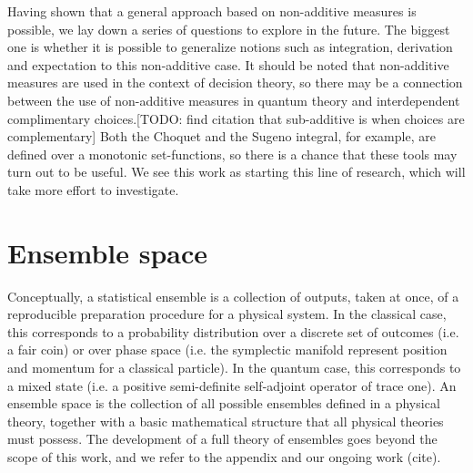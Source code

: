 \documentclass[10pt,twocolumn, nofootinbib]{revtex4-2}
\begin{document}
Having shown that a general approach based on non-additive measures is possible, we lay down a series of questions to explore in the future. The biggest one is whether it is possible to generalize notions such as integration, derivation and expectation to this non-additive case.  It should be noted that non-additive measures are used in the context of decision theory, so there may be a connection between the use of non-additive measures in quantum theory and interdependent complimentary choices.[TODO: find citation that sub-additive is when choices are complementary] Both the Choquet and the Sugeno integral, for example, are defined over a monotonic set-functions, so there is a chance that these tools may turn out to be useful. We see this work as starting this line of research, which will take more effort to investigate.

\section{Ensemble space}

Conceptually, a statistical ensemble is a collection of outputs, taken at once, of a reproducible preparation procedure for a physical system. In the classical case, this corresponds to a probability distribution over a discrete set of outcomes (i.e. a fair coin) or over phase space (i.e. the symplectic manifold represent position and momentum for a classical particle). In the quantum case, this corresponds to a mixed state (i.e. a positive semi-definite self-adjoint operator of trace one). An ensemble space is the collection of all possible ensembles defined in a physical theory, together with a basic mathematical structure that all physical theories must possess. The development of a full theory of ensembles goes beyond the scope of this work, and we refer to the appendix and our ongoing work (cite).
\end{document}
